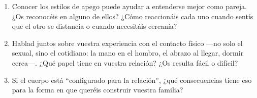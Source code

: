 \paracaminar

\begin{enumerate}
  \item Conocer los estilos de apego puede ayudar a entenderse mejor como pareja. ¿Os reconocéis en alguno de ellos? ¿Cómo reaccionáis cada uno cuando sentís que el otro se distancia o cuando necesitáis cercanía?

  \item Hablad juntos sobre vuestra experiencia con el contacto físico ---no solo el sexual, sino el cotidiano: la mano en el hombro, el abrazo al llegar, dormir cerca---. ¿Qué papel tiene en vuestra relación? ¿Os resulta fácil o difícil?

  \item Si el cuerpo está ``configurado para la relación'', ¿qué consecuencias tiene eso para la forma en que queréis construir vuestra familia?
\end{enumerate}

